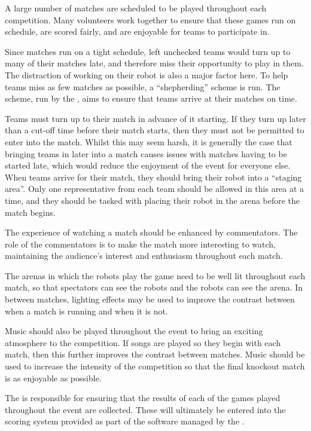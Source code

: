 A large number of matches are scheduled to be played throughout each competition.  Many volunteers work together to ensure that these games run on schedule, are scored fairly, and are enjoyable for teams to participate in.

Since matches run on a tight schedule, left unchecked teams would turn up to many of their matches late, and therefore miss their opportunity to play in them.  The distraction of working on their robot is also a major factor here.  To help teams miss as few matches as possible, a ``shepherding'' scheme is run.  The scheme, run by the , aims to ensure that teams arrive at their matches on time.

Teams must turn up to their match in advance of it starting.  If they turn up later than a cut-off time before their match starts, then they must not be permitted to enter into the match.  Whilst this may seem harsh, it is generally the case that bringing teams in later into a match causes issues with matches having to be started late, which would reduce the enjoyment of the event for everyone else.  When teams arrive for their match, they should bring their robot into a ``staging area''.  Only one representative from each team should be allowed in this area at a time, and they should be tasked with placing their robot in the arena before the match begins.

The experience of watching a match should be enhanced by commentators.  The role of the commentators is to make the match more interesting to watch, maintaining the audience's interest and enthusiasm throughout each match.

The arenas in which the robots play the game need to be well lit throughout each match, so that spectators can see the robots and the robots can see the arena.  In between matches, lighting effects may be used to improve the contrast between when a match is running and when it is not.

Music should also be played throughout the event to bring an exciting atmosphere to the competition.  If songs are played so they begin with each match, then this further improves the contrast between matches.  Music should be used to increase the intensity of the competition so that the final knockout match is as enjoyable as possible.

The  is responsible for ensuring that the results of each of the games played throughout the event are collected.  These will ultimately be entered into the scoring system provided as part of the software managed by the .

